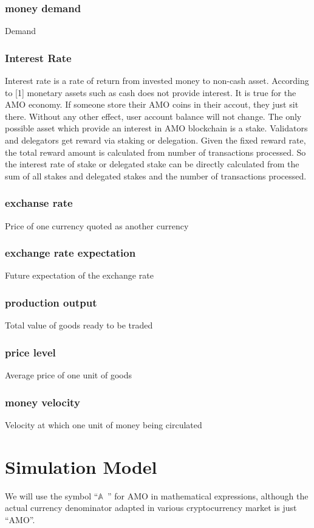 \documentclass[a4paper,11pt]{scrartcl}
\newcommand{\amo}{$\mathbb{A}$\ }
\begin{document}
\subsubsection{money demand}
Demand

\subsubsection{Interest Rate}
Interest rate is a rate of return from invested money to non-cash asset.
According to [1] monetary assets such as cash does not provide interest. It is
true for the AMO economy. If someone store their AMO coins in their accout,
they just sit there. Without any other effect, user account balance will not
change. The only possible asset which provide an interest in AMO blockchain is
a stake. Validators and delegators get reward via staking or delegation. Given
the fixed reward rate, the total reward amount is calculated from number of
transactions processed. So the interest rate of stake or delegated stake can be
directly calculated from the sum of all stakes and delegated stakes and the
number of transactions processed.

\subsubsection{exchanse rate}
Price of one currency quoted as another currency
\subsubsection{exchange rate expectation}
Future expectation of the exchange rate
\subsubsection{production output}
Total value of goods ready to be traded
\subsubsection{price level}
Average price of one unit of goods
\subsubsection{money velocity}
Velocity at which one unit of money being circulated

\section{Simulation Model}
We will use the symbol ``\amo'' for AMO in mathematical expressions, although
the actual currency denominator adapted in various cryptocurrency market is
just ``AMO''.
\end{document}
